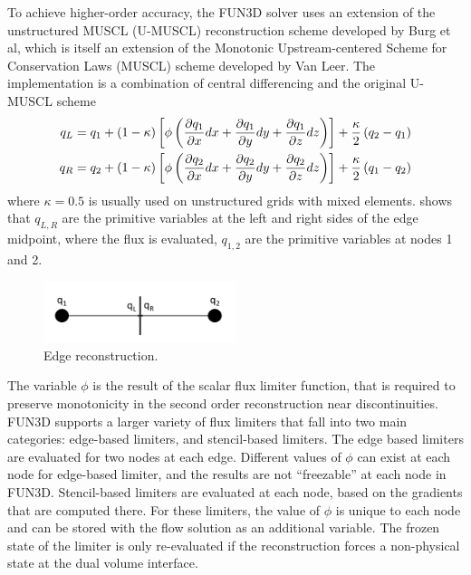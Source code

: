 To achieve higher-order accuracy, the FUN3D solver uses an extension of the
unstructured MUSCL (U-MUSCL) reconstruction scheme developed by Burg et
al\cite{burg2005higher,burg2003verification}, which is itself an extension of
the Monotonic Upstream-centered Scheme for Conservation Laws (MUSCL) scheme
developed by Van Leer\cite{van1979towards}.  The implementation is a combination
of central differencing and the original U-MUSCL scheme
\begin{equation}
  \begin{aligned}
    q_L &= q_1 + (1-\kappa)\left[ \phi\left( \frac{\partial q_1}{\partial x}dx + \frac{\partial q_1}{\partial y}dy +
    \frac{\partial q_1}{\partial z}dz \right) \right] + \frac{\kappa}{2}\left( q_2 - q_1 \right) \\
    q_R &= q_2 + (1-\kappa)\left[ \phi\left( \frac{\partial q_2}{\partial x}dx + \frac{\partial q_2}{\partial y}dy +
    \frac{\partial q_2}{\partial z}dz \right) \right] + \frac{\kappa}{2}\left( q_1 - q_2 \right)
  \end{aligned}
  \label{u-muscl}
\end{equation}
where $\kappa = 0.5$ is usually used on unstructured grids with mixed elements.
 shows that $q_{L,R}$ are the primitive variables at the
left and right sides of the edge midpoint, where the flux is evaluated,
$q_{1,2}$ are the primitive variables at nodes 1 and 2.
\begin{figure}[h]
  \centering
  \includegraphics[width=0.5\textwidth]{figures/edge_reconstruction.png}
  \caption{Edge reconstruction.}
  \label{fig:edge-recons}
\end{figure}
The variable $\phi$ is the result of the scalar flux limiter function, that is
required to preserve monotonicity in the second order reconstruction near
discontinuities.  FUN3D supports a larger variety of flux limiters that fall
into two main categories: edge-based limiters, and stencil-based limiters.  The
edge based limiters are evaluated for two nodes at each edge.  Different values
of $\phi$ can exist at each node for edge-based limiter, and the results are not
``freezable'' at each node in FUN3D. Stencil-based limiters are evaluated at
each node, based on the gradients that are computed there.  For these limiters,
the value of $\phi$ is unique to each node and can be stored with the flow
solution as an additional variable.  The frozen state of the limiter is only
re-evaluated if the reconstruction forces a non-physical state at the dual
volume interface.

